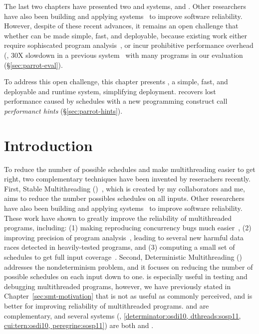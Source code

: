 The last two chapters have presented two \smt and \dmt systems, \tern and
\peregrine. Other researchers have also been building and applying \smt
systems~\cite{determinator:osdi10, dthreads:sosp11, ics:oopsla13} to improve
software reliability. However, despite of these recent advances, it remains an
open challenge that whether \smt can be made simple, fast, and deployable,
because existing work either require sophiscated program
analysis~\cite{cui:tern:osdi10, peregrine:sosp11, ics:oopsla13}, or incur
prohibitive performance overhead (\eg, 30X slowdown in a previous
system~\cite{dthreads:sosp11} with many programs in our evaluation
(\S\ref{sec:parrot-eval}).

To address this open challenge, this chapter presents \parrot, a simple, fast,
and deployable \smt and \dmt runtime system, simplifying deployment. \parrot
recovers lost performance caused by \smt schedules with a new programming
construct call \emph{performanct hints} (\S\ref{sec:parrot-hints}).

\section{Introduction} \label{sec:parrot-intro}

To reduce the number of possible schedules and make multithreading easier to get
right, two complementary techniques have been invented by reserachers recently.
First, Stable Multithreading (\smt)~\cite{determinator:osdi10, cui:tern:osdi10,
dthreads:sosp11, peregrine:sosp11}, which
is created by my collaborators and me, aims to reduce the number possibles
schedules on all inputs. Other researchers have also been building and applying \smt
systems~\cite{determinator:osdi10, dthreads:sosp11, ics:oopsla13} to improve
software reliability. These work have shown to greatly improve the
reliability of multithreaded programs, including: (1) making reproducing
concurrency bugs much easier~\cite{cui:tern:osdi10, peregrine:sosp11}, (2)
improving precision of program analysis~\cite{peregrine:sosp11, wu:pldi12},
leading to several new harmful data races detected in heavily-tested programs,
and (3) computing a small set of schedules to get full input
coverage~\cite{ics:oopsla13}.
Second, Deterministic Multithreading
(\dmt)~\cite{dmp:asplos09,kendo:asplos09,coredet:asplos10,
dos:osdi10,grace:oopsla09} addresses the nondeterminism problem, and it focuses
on reducing the number of possible schedules on each input down to one. \dmt is especially useful in testing and debugging multithreaded programs, however, we have previously stated in Chapter~\ref{sec:smt-motivation} that \dmt is not as useful as commonly perceived, and \smt is better for improving reliability of multithreaded programs. \smt and \dmt are complementary, and several systems (\eg, \ref{determinator:osdi10, dthreads:sosp11, cui:tern:osdi10, peregrine:sosp11}) are both \smt and \dmt.


